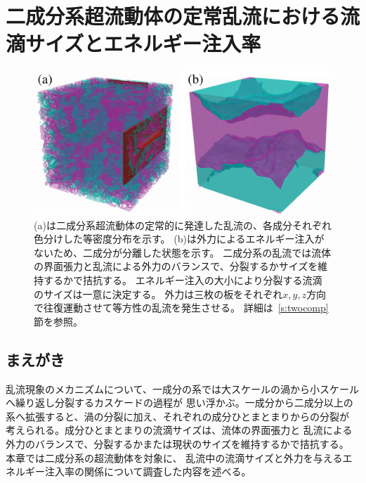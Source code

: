 \documentclass[12pt,a4paper]{jbook}
\begin{document}
	\chapter{二成分系超流動体の定常乱流における流滴サイズとエネルギー注入率}
    \label{c:khscale}
        \begin{figure}[H]
            \centering
	        \includegraphics[width=16cm]{droplet.eps}
            \caption{
                (a)は二成分系超流動体の定常的に発達した乱流の、各成分それぞれ色分けした等密度分布を示す。
                (b)は外力によるエネルギー注入がないため、二成分が分離した状態を示す。
                二成分系の乱流では流体の界面張力と乱流による外力のバランスで、分裂するかサイズを維持するかで拮抗する。
                エネルギー注入の大小により分裂する流滴のサイズは一意に決定する。
                外力は三枚の板をそれぞれ$x,y,z$方向で往復運動させて等方性の乱流を発生させる。
                詳細は~\ref{s:twocomp}節を参照。
            }
            \label{FIG:khtop}
        \end{figure}

		\section{まえがき}
        乱流現象のメカニズムについて、一成分の系では大スケールの渦から小スケールへ繰り返し分裂するカスケードの過程が
        思い浮かぶ。一成分から二成分以上の系へ拡張すると、渦の分裂に加え、それぞれの成分ひとまとまりからの分裂が
        考えられる。成分ひとまとまりの流滴サイズは、流体の界面張力と
        乱流による外力のバランスで、分裂するかまたは現状のサイズを維持するかで拮抗する。
        本章では二成分系の超流動体を対象に、
        乱流中の流滴サイズと外力を与えるエネルギー注入率の関係について調査した内容を述べる。
\end{document}
